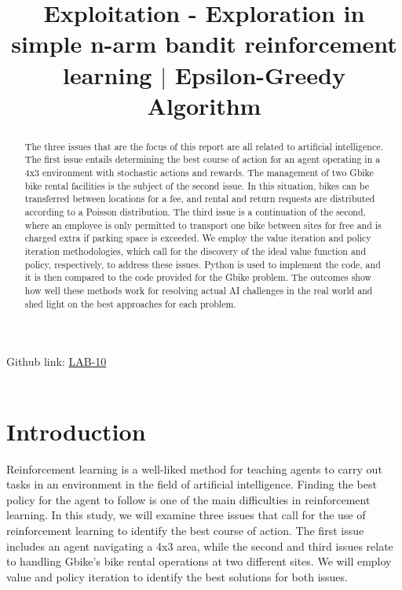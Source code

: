 \documentclass[conference]{IEEEtran}
\begin{document}
\title{Exploitation - Exploration in simple n-arm
bandit reinforcement learning $|$ Epsilon-Greedy Algorithm}
\author{
\and
{}
\and
{}
\and
{}
}
\maketitle
\setlength{\parindent}{20pt}
\noindent Github link: \href{https://github.com/JARVIS-codebase/LAB-10}{LAB-10} \\ \\ 
\indent \begin{abstract}
The three issues that are the focus of this report are all related to artificial intelligence. The first issue entails determining the best course of action for an agent operating in a 4x3 environment with stochastic actions and rewards. The management of two Gbike bike rental facilities is the subject of the second issue. In this situation, bikes can be transferred between locations for a fee, and rental and return requests are distributed according to a Poisson distribution.
The third issue is a continuation of the second, where an employee is only permitted to transport one bike between sites for free and is charged extra if parking space is exceeded. We employ the value iteration and policy iteration methodologies, which call for the discovery of the ideal value function and policy, respectively, to address these issues. Python is used to implement the code, and it is then compared to the code provided for the Gbike problem. The outcomes show how well these methods work for resolving actual AI challenges in the real world and shed light on the best approaches for each problem.
\end{abstract}
\IEEEpeerreviewmaketitle
\section{Introduction}
Reinforcement learning is a well-liked method for teaching agents to carry out tasks in an environment in the field of artificial intelligence. Finding the best policy for the agent to follow is one of the main difficulties in reinforcement learning. In this study, we will examine three issues that call for the use of reinforcement learning to identify the best course of action. The first issue includes an agent navigating a 4x3 area, while the second and third issues relate to handling Gbike's bike rental operations at two different sites. We will employ value and policy iteration to identify the best solutions for both issues.
\end{document}
